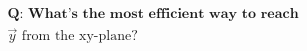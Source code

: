 \documentclass[preview]{standalone}
\begin{document}
\begin{align*}
\textbf{Q: What's the most efficient way to reach}\\ \vec{y} \,\, \text{from the xy-plane?}
\end{align*}
\end{document}
